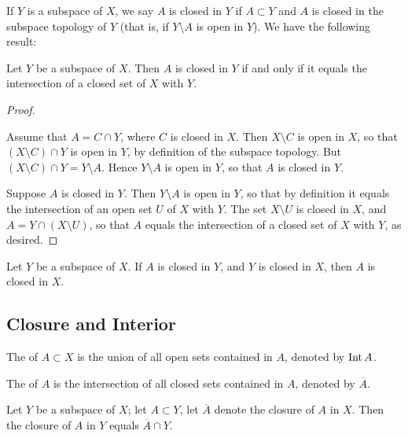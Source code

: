 If $Y$ is a subspace of $X$, we say $A$ is closed in $Y$ if $A\subset Y$ and $A$ is closed in the subspace topology of $Y$ (that is, if $Y\setminus A$ is open in $Y$). We have the following result:

\begin{proposition}
Let $Y$ be a subspace of $X$. Then $A$ is closed in $Y$ if and only if it equals the intersection of a closed set of $X$ with $Y$.
\end{proposition}

\begin{proof} \

\fbox{$\impliedby$} Assume that $A=C\cap Y$, where $C$ is closed in $X$. Then $X\setminus C$ is open in $X$, so that $(X\setminus C)\cap Y$ is open in $Y$, by definition of the subspace topology. But $(X\setminus C)\cap Y=Y\setminus A$. Hence $Y\setminus A$ is open in $Y$, so that $A$ is closed in $Y$.

\fbox{$\implies$} Suppose $A$ is closed in $Y$. Then $Y\setminus A$ is open in $Y$, so that by definition it equals the intersection of an open set $U$ of $X$ with $Y$. The set $X\setminus U$ is closed in $X$, and $A=Y\cap(X\setminus U)$, so that $A$ equals the intersection of a closed set of $X$ with $Y$, as desired.
\end{proof}

\begin{proposition}
Let $Y$ be a subspace of $X$. If $A$ is closed in $Y$, and $Y$ is closed in $X$, then $A$ is closed in $X$.
\end{proposition}

\subsection{Closure and Interior}
\begin{definition}
The  of $A\subset X$ is the union of all open sets contained in $A$, denoted by $\operatorname{Int} A$.

The  of $A$ is the intersection of all closed sets contained in $A$, denoted by $\overline{A}$.
\end{definition}

\begin{proposition}
Let $Y$ be a subspace of $X$; let $A\subset Y$, let $\overline{A}$ denote the closure of $A$ in $X$. Then the closure of $A$ in $Y$ equals $\overline{A}\cap Y$.
\end{proposition}



